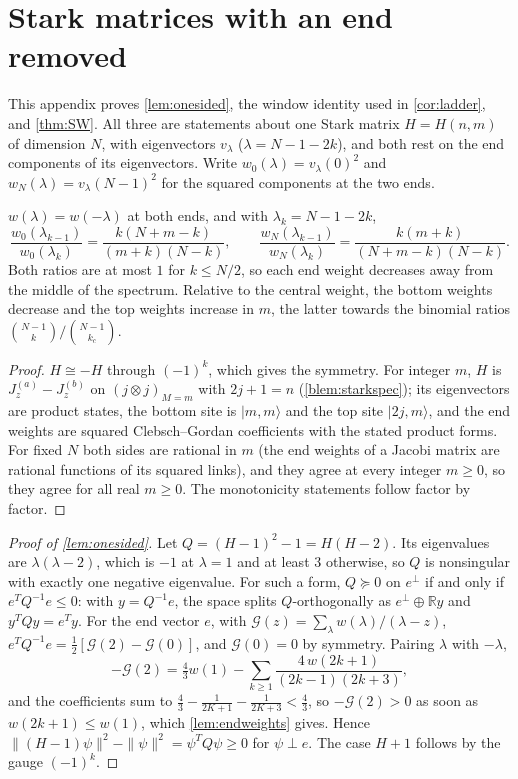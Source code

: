 \section{Stark matrices with an end removed}\label{app:windows}

This appendix proves \cref{lem:onesided}, the window identity used in
\cref{cor:ladder}, and \cref{thm:SW}. All three are statements about one Stark matrix
$H=H(n,m)$ of dimension $N$, with eigenvectors $v_\lambda$ ($\lambda=N-1-2k$), and both
rest on the end components of its eigenvectors. Write $w_0(\lambda)=v_\lambda(0)^2$ and
$w_N(\lambda)=v_\lambda(N-1)^2$ for the squared components at the two ends.

\begin{lemma}\label{lem:endweights}
$w(\lambda)=w(-\lambda)$ at both ends, and with $\lambda_k=N-1-2k$,
\[
  \frac{w_0(\lambda_{k-1})}{w_0(\lambda_k)}=\frac{k(N+m-k)}{(m+k)(N-k)},\qquad
  \frac{w_N(\lambda_{k-1})}{w_N(\lambda_k)}=\frac{k(m+k)}{(N+m-k)(N-k)} .
\]
Both ratios are at most $1$ for $k\le N/2$, so each end weight decreases away from the
middle of the spectrum. Relative to the central weight, the bottom weights decrease and the
top weights increase in $m$, the latter towards the binomial ratios
$\binom{N-1}k/\binom{N-1}{k_c}$.
\end{lemma}

\begin{proof}
$H\cong-H$ through $(-1)^k$, which gives the symmetry. For integer $m$, $H$ is
$J^{(a)}_z-J^{(b)}_z$ on $(j\otimes j)_{M=m}$ with $2j+1=n$ (\cref{blem:starkspec}); its
eigenvectors are product states, the bottom site is $|m,m\rangle$ and the top site
$|2j,m\rangle$, and the end weights are squared Clebsch--Gordan coefficients with the
stated product forms. For fixed $N$ both sides are rational in $m$ (the end weights of a
Jacobi matrix are rational functions of its squared links), and they agree at every integer
$m\ge0$, so they agree for all real $m\ge0$. The monotonicity statements follow factor by
factor.
\end{proof}

\begin{proof}[Proof of \cref{lem:onesided}]
Let $Q=(H-1)^2-1=H(H-2)$. Its eigenvalues are $\lambda(\lambda-2)$, which is $-1$ at
$\lambda=1$ and at least $3$ otherwise, so $Q$ is nonsingular with exactly one negative
eigenvalue. For such a form, $Q\succeq0$ on $e^\perp$ if and only if $e^TQ^{-1}e\le0$: with
$y=Q^{-1}e$, the space splits $Q$-orthogonally as $e^\perp\oplus\mathbb Ry$ and $y^TQy=e^Ty$.
For the end vector $e$, with $\mathcal G(z)=\sum_\lambda w(\lambda)/(\lambda-z)$,
$e^TQ^{-1}e=\frac12[\mathcal G(2)-\mathcal G(0)]$, and $\mathcal G(0)=0$ by symmetry. Pairing $\lambda$ with $-\lambda$,
\[
  -\mathcal G(2)=\tfrac43w(1)-\sum_{k\ge1}\frac{4\,w(2k+1)}{(2k-1)(2k+3)},
\]
and the coefficients sum to $\frac43-\frac1{2K+1}-\frac1{2K+3}<\frac43$, so $-\mathcal G(2)>0$ as soon as
$w(2k+1)\le w(1)$, which \cref{lem:endweights} gives. Hence $\|(H-1)\psi\|^2-\|\psi\|^2=
\psi^TQ\psi\ge0$ for $\psi\perp e$. The case $H+1$ follows by the gauge $(-1)^k$.
\end{proof}

